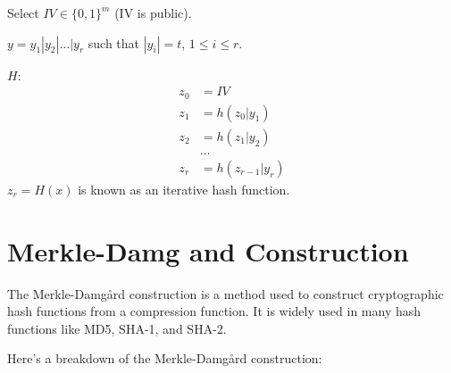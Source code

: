 \documentclass[11pt]{article}
\begin{document}
Select $IV \in \{0, 1\}^m$ (IV is public).

$y = y_1 | y_2 | \dots | y_r$ such that $|y_i| = t$, $1 \leq i \leq r$.

$H$:
\[
\begin{aligned}
    z_0 &= IV \\
    z_1 &= h(z_0 | y_1) \\
    z_2 &= h(z_1 | y_2) \\
    &\dots \\
    z_r &= h(z_{r-1} | y_r)
\end{aligned}
\]
$z_r = H(x)$ is known as an iterative hash function.




\section*{Merkle-Damg and Construction}

The Merkle-Damgård construction is a method used to construct cryptographic hash functions from a compression function. It is widely used in many hash functions like MD5, SHA-1, and SHA-2.

Here's a breakdown of the Merkle-Damgård construction:
\end{document}
